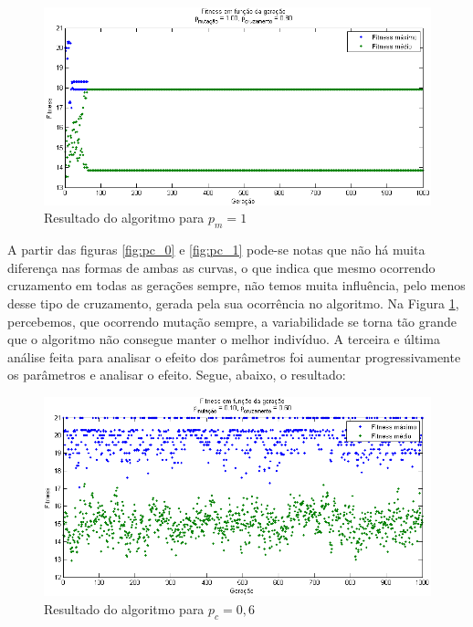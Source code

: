 \documentclass[12pt]{elsarticle}
\begin{document}
	\begin{figure}[h]
		\centering
		\includegraphics[width=13cm]{img/pm_1.png}
		\caption{Resultado do algoritmo para $p_{m}=1$}
		\label{fig:pm_1}
	\end{figure}
	
	A partir das figuras \ref{fig:pc_0} e \ref{fig:pc_1} pode-se notas que não há muita diferença nas formas de ambas as curvas, o que indica que mesmo ocorrendo cruzamento em todas as gerações sempre, não temos muita influência, pelo menos desse tipo de cruzamento, gerada pela sua ocorrência no algoritmo.
	Na Figura \ref{fig:pm_1}, percebemos, que ocorrendo mutação sempre, a variabilidade se torna tão grande que o algoritmo não consegue manter o melhor indivíduo.
	\newpage
	A terceira e última análise feita para analisar o efeito dos parâmetros foi aumentar progressivamente os parâmetros e analisar o efeito. Segue, abaixo, o resultado:
	\begin{figure}[h]
		\centering
		\includegraphics[width=13cm]{img/pc_06.png}
		\caption{Resultado do algoritmo para $p_{c}=0,6$}
		\label{fig:pc_06}
	\end{figure}
	
\end{document}
